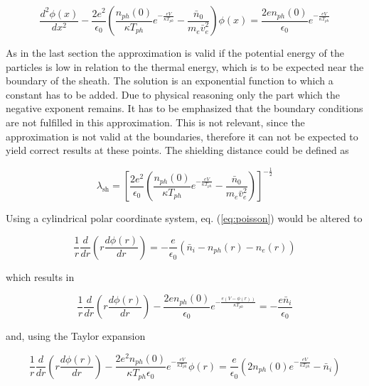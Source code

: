 \documentclass[a4paper,11pt]{thesis}
\begin{document}
\begin{equation}
   \frac{d^2 \phi(x)}{dx^2}-\frac{2e^2}{\epsilon_0}\left(\frac{n_{ph}(0)}{ \kappa T_{ph}} e^{-\frac{eV}{\kappa T_{ph}}}  -\frac{\bar{n}_0}{ m_e\bar{v}_e^2}\right) \phi(x)=\frac{2en_{ph}(0)}{\epsilon_0} e^{-\frac{eV}{\kappa T_{ph}}}
\end{equation}

As in the last section the approximation is valid if the potential energy of the particles is low in relation to the thermal energy, which is to be expected near the boundary of the sheath. The solution is an exponential function to which a constant has to be added. Due to physical reasoning only the part which the negative exponent remains. It has to be emphasized that the boundary conditions are not fulfilled in this approximation. This is not relevant, since the approximation is not valid at the boundaries, therefore it can not be expected to yield correct results at these points. The shielding distance could be defined as

\begin{equation}\label{eq:sheath_debye_length}
    \lambda_{\textrm{sh}}=\left[\frac{2e^2}{\epsilon_0}\left(\frac{n_{ph}(0)}{ \kappa T_{ph}} e^{-\frac{eV}{\kappa T_{ph}}}  -\frac{\bar{n}_0}{ m_e\bar{v}_e^2}\right)\right]^{-\frac{1}{2}}
\end{equation}


Using a cylindrical polar coordinate system, eq. (\ref{eq:poisson}) would be altered to

\begin{equation}\label{eq:poisson_cyl}
    \frac{1}{r}\frac{d}{dr}\left( r\frac{d \phi(r)}{dr}\right)=-\frac{e}{\epsilon_0}\left( \bar{n}_i -n_{ph}(r)-n_{e}(r) \right)
\end{equation}

which results in

\begin{equation}\label{eq:poisson_cyl_2}
    \frac{1}{r}\frac{d}{dr}\left( r\frac{d \phi(r)}{dr}\right)-\frac{2en_{ph}(0)}{\epsilon_0} e^{-\frac{e(V-\phi(r))}{\kappa T_{ph}}} =-\frac{e\bar{n}_i }{\epsilon_0}
\end{equation}

and, using the Taylor expansion

\begin{equation}\label{eq:poisson_cyl_lin}
    \frac{1}{r}\frac{d}{dr}\left( r\frac{d \phi(r)}{dr}\right)-\frac{2e^2 n_{ph}(0)}{\kappa T_{ph} \epsilon_0} e^{-\frac{eV}{\kappa T_{ph}}}\phi(r) =\frac{e}{\epsilon_0}(2n_{ph}(0)e^{-\frac{eV}{\kappa T_{ph}}}-\bar{n}_i)
\end{equation}
\end{document}
